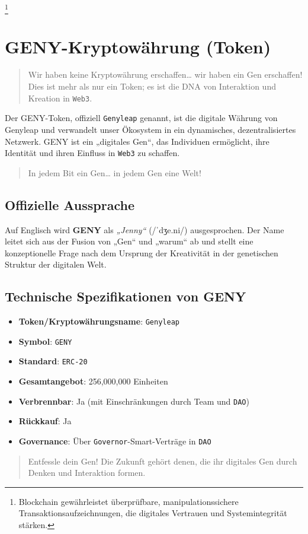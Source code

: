 \documentclass[a4paper,12pt,openany]{book}
\begin{document}
\footnote{Blockchain gewährleistet überprüfbare, manipulationssichere Transaktionsaufzeichnungen, die digitales Vertrauen und Systemintegrität stärken.}

\chapter{GENY-Kryptowährung (Token)}
\begin{quote}
Wir haben keine Kryptowährung erschaffen… wir haben ein Gen erschaffen! Dies ist mehr als nur ein Token; es ist die DNA von Interaktion und Kreation in \texttt{Web3}.
\end{quote}
Der GENY-Token, offiziell \texttt{Genyleap} genannt, ist die digitale Währung von Genyleap und verwandelt unser Ökosystem in ein dynamisches, dezentralisiertes Netzwerk. GENY ist ein „digitales Gen“, das Individuen ermöglicht, ihre Identität und ihren Einfluss in \texttt{Web3} zu schaffen.
\begin{quote}
In jedem Bit ein Gen… in jedem Gen eine Welt!
\end{quote}

\section*{Offizielle Aussprache}
Auf Englisch wird \textbf{GENY} als \textit{„Jenny“} ({\ipafont /ˈdʒe.ni/}) ausgesprochen. Der Name leitet sich aus der Fusion von „Gen“ und „warum“ ab und stellt eine konzeptionelle Frage nach dem Ursprung der Kreativität in der genetischen Struktur der digitalen Welt.

\section*{Technische Spezifikationen von GENY}
\begin{itemize}
    \item \textbf{Token/Kryptowährungsname}: \texttt{Genyleap}
    \item \textbf{Symbol}: \texttt{GENY}
    \item \textbf{Standard}: \texttt{ERC-20}
    \item \textbf{Gesamtangebot}: 256,000,000 Einheiten
    \item \textbf{Verbrennbar}: Ja (mit Einschränkungen durch Team und \texttt{DAO})
    \item \textbf{Rückkauf}: Ja
    \item \textbf{Governance}: Über \texttt{Governor}-Smart-Verträge in \texttt{DAO}
\end{itemize}
\vspace{-0.5em}
\begin{quote}
Entfessle dein Gen! Die Zukunft gehört denen, die ihr digitales Gen durch Denken und Interaktion formen.
\end{quote}
\newpage
\end{document}
